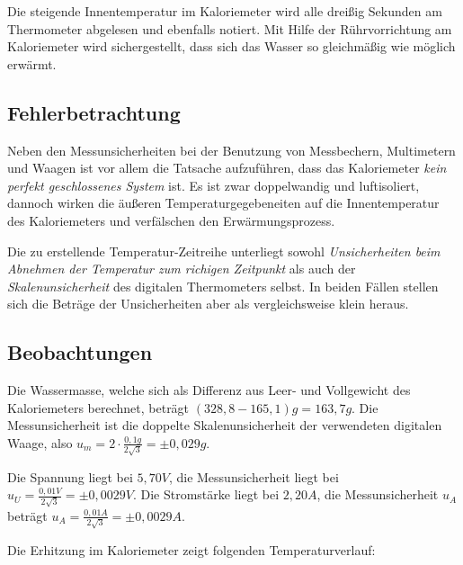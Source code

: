 \documentclass[
  9pt,
]{article}
\begin{document}
Die steigende Innentemperatur im Kaloriemeter wird alle dreißig Sekunden
am Thermometer abgelesen und ebenfalls notiert. Mit Hilfe der
Rührvorrichtung am Kaloriemeter wird sichergestellt, dass sich das
Wasser so gleichmäßig wie möglich erwärmt.

\hypertarget{fehlerbetrachtung}{%
\subsection{Fehlerbetrachtung}\label{fehlerbetrachtung}}

Neben den Messunsicherheiten bei der Benutzung von Messbechern,
Multimetern und Waagen ist vor allem die Tatsache aufzuführen, dass das
Kaloriemeter \emph{kein perfekt geschlossenes System} ist. Es ist zwar
doppelwandig und luftisoliert, dannoch wirken die äußeren
Temperaturgegebeneiten auf die Innentemperatur des Kaloriemeters und
verfälschen den Erwärmungsprozess.

Die zu erstellende Temperatur-Zeitreihe unterliegt sowohl
\emph{Unsicherheiten beim Abnehmen der Temperatur zum richigen
Zeitpunkt} als auch der \emph{Skalenunsicherheit} des digitalen
Thermometers selbst. In beiden Fällen stellen sich die Beträge der
Unsicherheiten aber als vergleichsweise klein heraus.

\hypertarget{beobachtungen}{%
\subsection{Beobachtungen}\label{beobachtungen}}

Die Wassermasse, welche sich als Differenz aus Leer- und Vollgewicht des
Kaloriemeters berechnet, beträgt \((328,8-165,1)g=163,7g\). Die
Messunsicherheit ist die doppelte Skalenunsicherheit der verwendeten
digitalen Waage, also \(u_m=2\cdot \frac{0,1g}{2\sqrt{3}} = \pm0,029g\).

Die Spannung liegt bei \(5,70V\), die Messunsicherheit liegt bei
\(u_U=\frac{0,01V}{2\sqrt{3}}= \pm0,0029V\). Die Stromstärke liegt bei
\(2,20A\), die Messunsicherheit \(u_A\) beträgt
\(u_A=\frac{0,01A}{2\sqrt{3}}=\pm0,0029A\).

Die Erhitzung im Kaloriemeter zeigt folgenden Temperaturverlauf:
\end{document}
